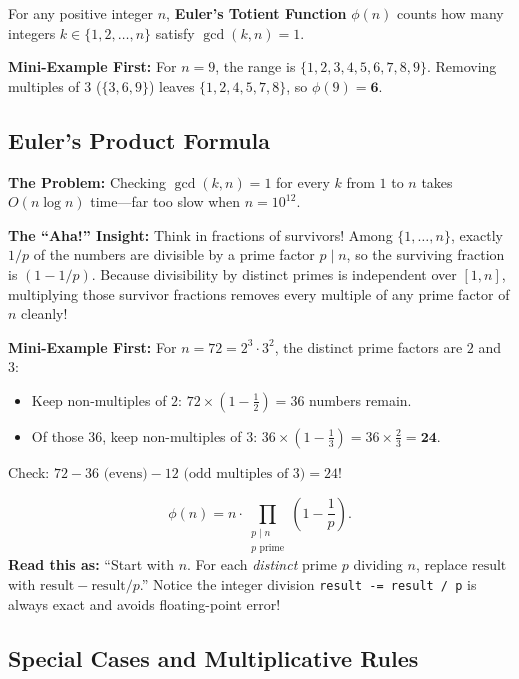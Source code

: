 \documentclass[11pt,a4paper]{article}
\theoremstyle{definition}
\newcommand{\painbeat}{\textbf{\color{accentamber}The Problem:} }
\newcommand{\ahabeat}{\textbf{\color{accentteal}The ``Aha!'' Insight:} }
\newcommand{\examplebeat}{\textbf{\color{primaryblue}Mini-Example First:} }
\begin{document}
For any positive integer $n$, \textbf{Euler's Totient Function} $\phi(n)$ counts how many integers $k \in \{1, 2, \dots, n\}$ satisfy $\gcd(k, n) = 1$.

\examplebeat For $n = 9$, the range is $\{1, 2, 3, 4, 5, 6, 7, 8, 9\}$. Removing multiples of $3$ ($\{3, 6, 9\}$) leaves $\{1, 2, 4, 5, 7, 8\}$, so $\phi(9) = \mathbf{6}$.

\subsection{Euler's Product Formula}

\painbeat Checking $\gcd(k, n) = 1$ for every $k$ from $1$ to $n$ takes $O(n \log n)$ time---far too slow when $n = 10^{12}$.

\ahabeat Think in fractions of survivors! Among $\{1, \dots, n\}$, exactly $1/p$ of the numbers are divisible by a prime factor $p \mid n$, so the surviving fraction is $(1 - 1/p)$. Because divisibility by distinct primes is independent over $[1, n]$, multiplying those survivor fractions removes every multiple of any prime factor of $n$ cleanly!

\examplebeat For $n = 72 = 2^3 \cdot 3^2$, the distinct prime factors are $2$ and $3$:
\begin{itemize}
    \item Keep non-multiples of $2$: $72 \times (1 - \tfrac{1}{2}) = 36$ numbers remain.
    \item Of those $36$, keep non-multiples of $3$: $36 \times (1 - \tfrac{1}{3}) = 36 \times \tfrac{2}{3} = \mathbf{24}$.
\end{itemize}
Check: $72 - 36\text{ (evens)} - 12\text{ (odd multiples of 3)} = 24$!

\begin{formulabox}
\[
    \phi(n) = n \cdot \prod_{\substack{p \mid n \\ p \text{ prime}}} \left(1 - \frac{1}{p}\right).
\]
\textbf{Read this as:} ``Start with $n$. For each \emph{distinct} prime $p$ dividing $n$, replace $\text{result}$ with $\text{result} - \text{result} / p$.'' Notice the integer division \texttt{result -= result / p} is always exact and avoids floating-point error!
\end{formulabox}

\subsection{Special Cases and Multiplicative Rules}
\end{document}
